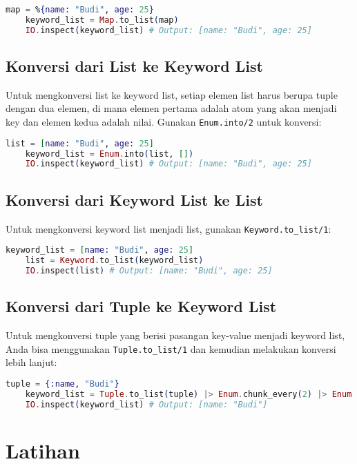 \begin{lstlisting}[language=Elixir]
	map = %{name: "Budi", age: 25}
	keyword_list = Map.to_list(map)
	IO.inspect(keyword_list) # Output: [name: "Budi", age: 25]
\end{lstlisting}

\subsection{Konversi dari List ke Keyword List}
Untuk mengkonversi list ke keyword list, setiap elemen list harus berupa tuple dengan dua elemen, di mana elemen pertama adalah atom yang akan menjadi key dan elemen kedua adalah nilai. Gunakan \texttt{Enum.into/2} untuk konversi:

\begin{lstlisting}[language=Elixir]
	list = [name: "Budi", age: 25]
	keyword_list = Enum.into(list, [])
	IO.inspect(keyword_list) # Output: [name: "Budi", age: 25]
\end{lstlisting}

\subsection{Konversi dari Keyword List ke List}
Untuk mengkonversi keyword list menjadi list, gunakan \texttt{Keyword.to\_list/1}:

\begin{lstlisting}[language=Elixir]
	keyword_list = [name: "Budi", age: 25]
	list = Keyword.to_list(keyword_list)
	IO.inspect(list) # Output: [name: "Budi", age: 25]
\end{lstlisting}

\subsection{Konversi dari Tuple ke Keyword List}
Untuk mengkonversi tuple yang berisi pasangan key-value menjadi keyword list, Anda bisa menggunakan \texttt{Tuple.to\_list/1} dan kemudian melakukan konversi lebih lanjut:

\begin{lstlisting}[language=Elixir]
	tuple = {:name, "Budi"}
	keyword_list = Tuple.to_list(tuple) |> Enum.chunk_every(2) |> Enum.map(fn [k, v] -> {k, v} end)
	IO.inspect(keyword_list) # Output: [name: "Budi"]
\end{lstlisting}

\section{Latihan}

